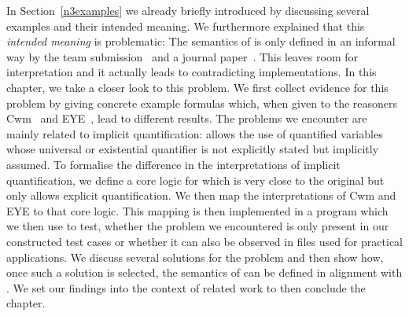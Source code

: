 










In Section~\ref{n3examples} we already briefly introduced \nthreelogic by discussing several examples and their intended meaning. We furthermore explained 
that this \emph{intended meaning} 
is problematic: The semantics of \nthreelogic is only defined in an informal way by the \wwwc team submission~\cite{Notation3} and a journal paper~\cite{N3Logic}. 
This leaves room for interpretation and it actually leads to contradicting implementations. 
In this chapter, we take a closer look to this problem. %
We first collect evidence for this problem by giving concrete example formulas which, when given to the reasoners Cwm~\cite{cwm} and EYE~\cite{eye}, lead to different results. The problems we encounter are mainly related to 
implicit quantification: \nthree allows the use of quantified variables whose universal or existential quantifier is not explicitly stated but implicitly assumed.
To formalise the difference in the interpretations of implicit quantification, we define a core logic for \nthree which is very close to the original but only allows explicit quantification. We then map the interpretations of Cwm and EYE to that core logic.
This mapping is then implemented in a program which we then use to test, whether the problem we encountered is only present in our constructed test cases or whether it can also be observed in files 
used for practical applications.
We discuss several solutions for the problem and then show how, once such a solution is selected, the semantics of \nthreelogic can be defined in alignment with \rdf.
We set our findings into the context of related work to then conclude the chapter.


